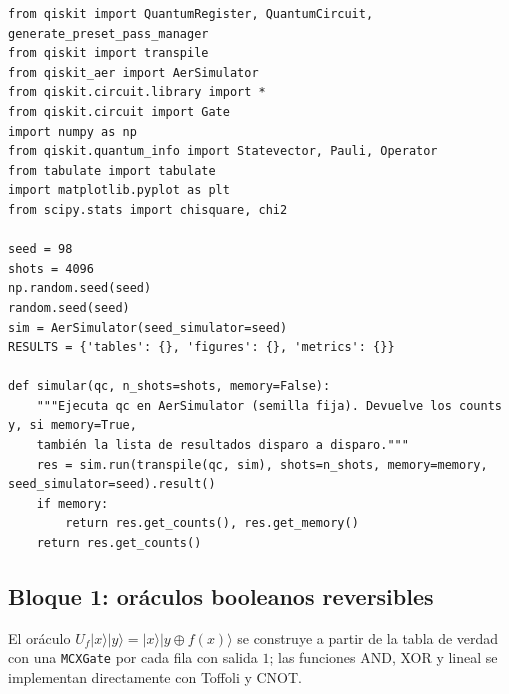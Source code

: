 \begin{lstlisting}[caption={Importaciones principales, semilla, número de disparos, simulador y función de simulación (todos los bloques).},label={lst:config}]
from qiskit import QuantumRegister, QuantumCircuit, generate_preset_pass_manager
from qiskit import transpile
from qiskit_aer import AerSimulator
from qiskit.circuit.library import *
from qiskit.circuit import Gate
import numpy as np
from qiskit.quantum_info import Statevector, Pauli, Operator
from tabulate import tabulate
import matplotlib.pyplot as plt
from scipy.stats import chisquare, chi2

seed = 98
shots = 4096
np.random.seed(seed)
random.seed(seed)
sim = AerSimulator(seed_simulator=seed)  
RESULTS = {'tables': {}, 'figures': {}, 'metrics': {}}

def simular(qc, n_shots=shots, memory=False):
    """Ejecuta qc en AerSimulator (semilla fija). Devuelve los counts y, si memory=True,
    también la lista de resultados disparo a disparo."""
    res = sim.run(transpile(qc, sim), shots=n_shots, memory=memory, seed_simulator=seed).result()
    if memory:
        return res.get_counts(), res.get_memory()
    return res.get_counts()
\end{lstlisting}

\subsection{Bloque 1: oráculos booleanos reversibles}

El oráculo $U_f|x\rangle|y\rangle=|x\rangle|y\oplus f(x)\rangle$ se construye a partir de la tabla de verdad con una \texttt{MCXGate} por cada fila con salida $1$; las funciones AND, XOR y lineal se implementan directamente con Toffoli y CNOT.

